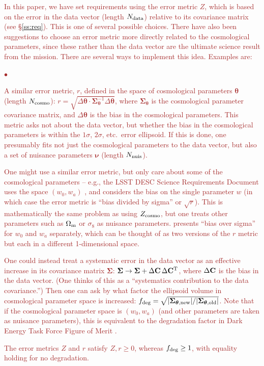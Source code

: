 \documentclass[usenatbib]{mnras}
\newcommand{\changetext}[1]{\textcolor{brown}{#1}}
\begin{document}
\changetext{In this paper, we have set requirements using the error metric $Z$, which is based on the error in the data vector (length $N_{\rm data}$) relative to its covariance matrix (see \S\ref{ss:req}). This is one of several possible choices. There have also been suggestions to choose an error metric more directly related to the cosmological parameters, since these rather than the data vector are the ultimate science result from the mission. There are several ways to implement this idea. Examples are:
\begin{list}{$\bullet$}{}
\item A similar error metric, $r$, defined in the space of cosmological parameters ${\boldsymbol\theta}$ (length $N_{\rm cosmo}$): $r = \sqrt{\Delta{\boldsymbol\theta} \cdot {\boldsymbol\Sigma}_{\boldsymbol\theta}^{-1} \Delta{\boldsymbol\theta}}$, where ${\boldsymbol\Sigma}_{\boldsymbol\theta}$ is the cosmological parameter covariance matrix, and $\Delta{\boldsymbol\theta}$ is the bias in the cosmological parameters. This metric asks not about the data vector, but whether the bias in the cosmological parameters is within the $1\sigma$, $2\sigma$, etc.\ error ellipsoid. If this is done, one presumably fits not just the cosmological parameters to the data vector, but also a set of nuisance parameters ${\boldsymbol\nu}$ (length $N_{\rm nuis}$).
\item One might use a similar error metric, but only care about some of the cosmological parameters -- e.g., the LSST DESC Science Requirements Document uses the space $(w_0,w_a)$ \citep{2018arXiv180901669T}, and \citet{2013MNRAS.429..661M} considers the bias on the single parameter $w$ (in which case the error metric is ``bias divided by sigma'' or $\sqrt r$). This is mathematically the same problem as using $Z_{\rm cosmo}$, but one treats other parameters such as $\Omega_{\rm m}$ or $\sigma_8$ as nuisance parameters. \citet{2020A&A...635A.139E} presents ``bias over sigma'' for $w_0$ and $w_a$ separately, which can be thought of as two versions of the $r$ metric but each in a different 1-dimensional space.
\item One could instead treat a systematic error in the data vector as an effective increase in its covariance matrix ${\boldsymbol\Sigma}$: ${\boldsymbol\Sigma} \rightarrow {\boldsymbol\Sigma} + \Delta{\bf C}\,\Delta{\bf C}^{\rm T}$, where $\Delta{\bf C}$ is the bias in the data vector. (One thinks of this as a ``systematics contribution to the data covariance.'') Then one can ask by what factor the ellipsoid volume in cosmological parameter space is increased: $f_{\rm deg} = \sqrt{|{\boldsymbol\Sigma}_{{\boldsymbol\theta},\rm new}|/|{\boldsymbol\Sigma}_{{\boldsymbol\theta},\rm old}|}$. Note that if the cosmological parameter space is $(w_0,w_a)$ (and other parameters are taken as nuisance parameters), this is equivalent to the degradation factor in Dark Energy Task Force Figure of Merit \citep{detf}.
\end{list}
The error metrics $Z$ and $r$ satisfy $Z,r\ge 0$, whereas $f_{\rm deg}\ge 1$, with equality holding for no degradation.}
\end{document}
